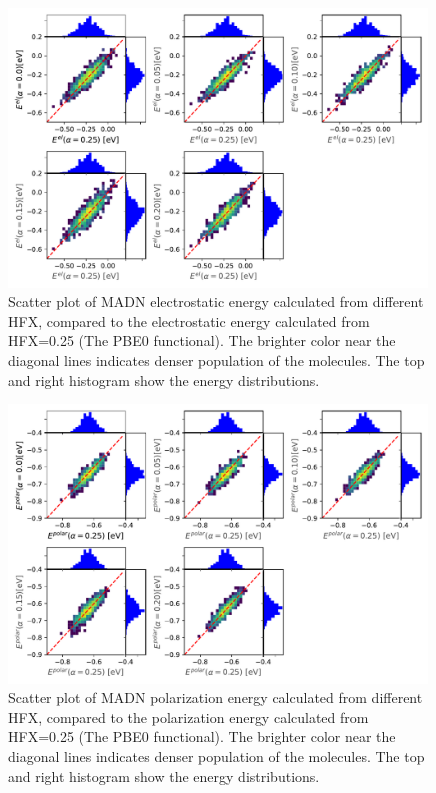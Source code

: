 \documentclass[letterpaper,12pt]{article}
\begin{document}
\begin{figure}[H]
    \centering
    \includegraphics[width=0.99\textwidth]{figs/scatterEstat_qmmm.pdf}
    \caption{Scatter plot of MADN electrostatic energy calculated from different HFX, compared to the electrostatic energy calculated from HFX=0.25 (The PBE0 functional). The brighter color near the diagonal lines indicates denser population of the molecules.  The top and right histogram show the energy distributions.}
    \label{fig:Estat_qmmm_MADN}
\end{figure}

\begin{figure}[H]
    \centering
    \includegraphics[width=0.99\textwidth]{figs/scatterEdip_qmmm.pdf}
    \caption{Scatter plot of MADN polarization energy calculated from different HFX, compared to the polarization energy calculated from HFX=0.25 (The PBE0 functional). The brighter color near the diagonal lines indicates denser population of the molecules.  The top and right histogram show the energy distributions.}
    \label{fig:Edip_qmmm_MADN}
\end{figure}
\end{document}
